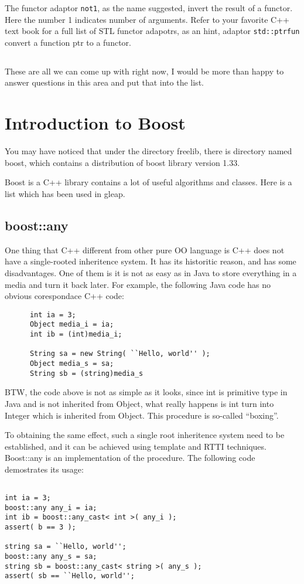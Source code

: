 \documentclass[letterpaper]{book}
\begin{document}
The functor adaptor \lstinline$not1$, as the name suggested, invert the result of a functor.
Here the number 1 indicates number of arguments. Refer to your favorite C++ text book for
a full list of STL functor adapotrs, as an hint, adaptor \lstinline$std::ptrfun$ convert a
function ptr to a functor.


\subsection*{}
  These are all we can come up with right now, I would be more than happy to
answer questions in this area and put that into the list.
        
\section{Introduction to Boost}

  You may have noticed that under the directory freelib, there is directory
named boost, which contains a distribution of boost library version 1.33.

  Boost is a C++ library contains a lot of useful algorithms and classes. 
Here is a list which has been used in gleap.

\subsection{boost::any}
  One thing that C++ different from other pure OO language is C++ does not 
have a single-rooted inheritence system. It has its historitic reason, and
has some disadvantages. One of them is it is not as easy as in Java to store
everything in a media and turn it back later. For example, the following Java
code has no obvious corespondace C++ code:
\begin{lstlisting}
      int ia = 3;
      Object media_i = ia;
      int ib = (int)media_i;

      String sa = new String( ``Hello, world'' );
      Object media_s = sa;
      String sb = (string)media_s
\end{lstlisting}
BTW, the code above is not as simple as it looks, since int is primitive type
in Java and is not inherited from Object, what really happens is int turn into 
Integer which is inherited from Object. This procedure is so-called ``boxing''.

To obtaining the same effect, such a single root inheritence system need to be
established, and it can be achieved using template and RTTI techniques. Boost::any is 
an implementation of the procedure. The following code demostrates its usage:
\begin{lstlisting}

int ia = 3;
boost::any any_i = ia;
int ib = boost::any_cast< int >( any_i );
assert( b == 3 );

string sa = ``Hello, world'';
boost::any any_s = sa;
string sb = boost::any_cast< string >( any_s );
assert( sb == ``Hello, world'';

\end{lstlisting}
\end{document}
